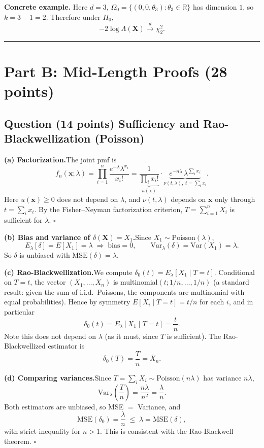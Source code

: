 \documentclass[11pt]{article}
\newcounter{qnum}
\newcommand{\question}[2]{\stepcounter{qnum}\subsection*{Question \theqnum \quad (#1 points) \hfill #2}}
\newcommand{\Var}{\mathrm{Var}}
\newcommand{\bX}{\mathbf{X}}
\begin{document}
\medskip

\textbf{Concrete example.} Here $d = 3$, $\Omega_0 = \{(0,0,\theta_3): \theta_3 \in \mathbb{R}\}$ has dimension $1$, so $k = 3-1 = 2$. Therefore under $H_0$,
\[
-2\log\Lambda(\bX) \xrightarrow{d} \chi^2_2.
\]

\bigskip
\hrule
\bigskip

\section*{Part B: Mid-Length Proofs \hfill (28 points)}

\question{14}{Sufficiency and Rao-Blackwellization (Poisson)}

\textbf{(a) Factorization.}\quad The joint pmf is
\[
f_n(\mathbf{x};\lambda) = \prod_{i=1}^n \frac{e^{-\lambda}\lambda^{x_i}}{x_i!}
= \underbrace{\frac{1}{\prod_i x_i!}}_{u(\mathbf{x})} \cdot \underbrace{e^{-n\lambda}\,\lambda^{\sum_i x_i}}_{\nu(t,\lambda),\;t = \sum_i x_i}.
\]
Here $u(\mathbf{x}) \ge 0$ does not depend on $\lambda$, and $\nu(t,\lambda)$ depends on $\mathbf{x}$ only through $t = \sum_i x_i$. By the Fisher--Neyman factorization criterion, $T = \sum_{i=1}^n X_i$ is sufficient for $\lambda$. \hfill$\square$

\medskip

\textbf{(b) Bias and variance of $\delta(\bX) = X_1$.}\quad Since $X_1 \sim \mathrm{Poisson}(\lambda)$,
\[
E_\lambda[\delta] = E[X_1] = \lambda \;\Rightarrow\; \text{bias} = 0, \qquad \Var_\lambda(\delta) = \Var(X_1) = \lambda.
\]
So $\delta$ is unbiased with $\mathrm{MSE}(\delta) = \lambda$.

\medskip

\textbf{(c) Rao-Blackwellization.}\quad We compute $\delta_0(t) = E_\lambda[X_1 \mid T = t]$. Conditional on $T = t$, the vector $(X_1,\ldots,X_n)$ is multinomial$(t; 1/n,\ldots,1/n)$ (a standard result: given the sum of i.i.d.\ Poissons, the components are multinomial with equal probabilities). Hence by symmetry $E[X_i \mid T = t] = t/n$ for each $i$, and in particular
\[
\delta_0(t) = E_\lambda[X_1 \mid T = t] = \frac{t}{n}.
\]
Note this does not depend on $\lambda$ (as it must, since $T$ is sufficient). The Rao-Blackwellized estimator is
\[
\delta_0(T) = \frac{T}{n} = \overline{X}_n.
\]

\medskip

\textbf{(d) Comparing variances.}\quad Since $T = \sum_i X_i \sim \mathrm{Poisson}(n\lambda)$ has variance $n\lambda$,
\[
\Var_\lambda\!\left(\frac{T}{n}\right) = \frac{n\lambda}{n^2} = \frac{\lambda}{n}.
\]
Both estimators are unbiased, so MSE $=$ Variance, and
\[
\mathrm{MSE}(\delta_0) = \frac{\lambda}{n} \;\le\; \lambda = \mathrm{MSE}(\delta),
\]
with strict inequality for $n > 1$. This is consistent with the Rao-Blackwell theorem. \hfill$\square$
\end{document}
